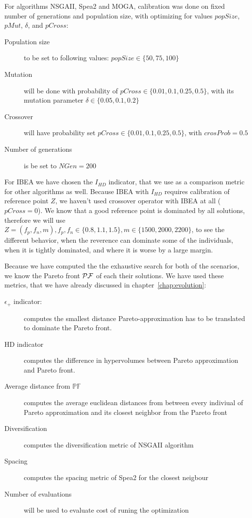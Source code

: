 \documentclass[12pt,oneside]{fithesis2}
\begin{document}
For algorithms NSGAII, Spea2 and MOGA, calibration was done on fixed number of generations and population size, with optimizing for values $popSize$, $pMut$, $\delta$, and $pCross$:

\begin{description}
  \item[Population size] to be set to following values: $popSize \in \{50,75,100\}$
\item[Mutation] will be done with probability of $pCross \in \{0.01,0.1,0.25,0.5\}$, with its mutation parameter $\delta \in \{0.05,0.1,0.2\}$
\item[Crossover] will have probability set $pCross \in \{0.01,0.1,0.25,0.5\}$, with $crosProb = 0.5$
\item[Number of generations] is be set to $NGen=200$ 
\end{description}

For IBEA we have chosen the $I_{HD}$ indicator, that we use as a comparison metric for other algorithms as well. Because IBEA with $I_{HD}$ requires calibration of reference point $Z$, we haven't used crossover operator with IBEA at all ($pCross=0$). We know that a good reference point is dominated by all solutions, therefore we will use $Z = (f_p,f_n,m), f_p,f_n \in \{0.8,1.1,1.5\}, m \in \{1500,2000,2200\}$, to see the different behavior, when the reverence can dominate some of the individuals, when it is tightly dominated, and where it is worse by a large margin.

Because we have computed the the exhaustive search for both of the scenarios, we know the Pareto front $\cal{PF}$ of each their solutions. We have used these metrics, that we have already discussed in chapter~\ref{chap:evolution}:

\begin{description}
  \item[$\epsilon_+$ indicator:] computes the smallest distance Pareto-approximation has to be translated to dominate the Pareto front.
  \item[HD indicator] computes the difference in hypervolumes between Pareto approximation and Pareto front.
  \item[Average distance from $\mathbb{PF}$] computes the average euclidean distances from between every indiviual of Pareto approximation and its closest neighbor from the Pareto front
  \item[Diversification] computes the diversification metric of NSGAII algorithm
  \item[Spacing] computes the spacing metric of Spea2 for the closest neigbour
  \item[Number of evaluations] will be used to evaluate cost of runing the optimization
\end{description}
 
\end{document}
